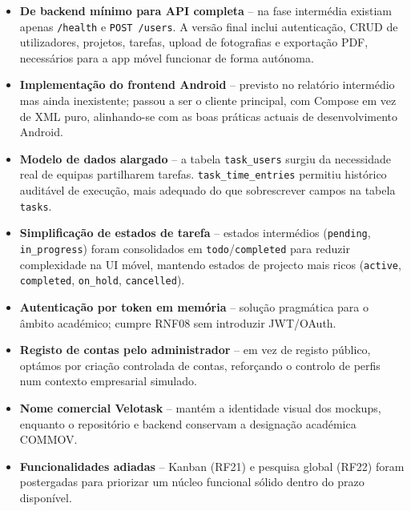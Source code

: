 \documentclass[12pt,a4paper]{article}
\begin{document}
\begin{itemize}[leftmargin=*]
    \item \textbf{De backend mínimo para API completa} -- na fase intermédia existiam apenas \texttt{/health} e \texttt{POST /users}. A versão final inclui autenticação, CRUD de utilizadores, projetos, tarefas, upload de fotografias e exportação PDF, necessários para a app móvel funcionar de forma autónoma.

    \item \textbf{Implementação do frontend Android} -- previsto no relatório intermédio mas ainda inexistente; passou a ser o cliente principal, com Compose em vez de XML puro, alinhando-se com as boas práticas actuais de desenvolvimento Android.

    \item \textbf{Modelo de dados alargado} -- a tabela \texttt{task\_users} surgiu da necessidade real de equipas partilharem tarefas. \texttt{task\_time\_entries} permitiu histórico auditável de execução, mais adequado do que sobrescrever campos na tabela \texttt{tasks}.

    \item \textbf{Simplificação de estados de tarefa} -- estados intermédios (\texttt{pending}, \texttt{in\_progress}) foram consolidados em \texttt{todo}/\texttt{completed} para reduzir complexidade na UI móvel, mantendo estados de projecto mais ricos (\texttt{active}, \texttt{completed}, \texttt{on\_hold}, \texttt{cancelled}).

    \item \textbf{Autenticação por token em memória} -- solução pragmática para o âmbito académico; cumpre RNF08 sem introduzir JWT/OAuth.

    \item \textbf{Registo de contas pelo administrador} -- em vez de registo público, optámos por criação controlada de contas, reforçando o controlo de perfis num contexto empresarial simulado.

    \item \textbf{Nome comercial Velotask} -- mantém a identidade visual dos mockups, enquanto o repositório e backend conservam a designação académica COMMOV.

    \item \textbf{Funcionalidades adiadas} -- Kanban (RF21) e pesquisa global (RF22) foram postergadas para priorizar um núcleo funcional sólido dentro do prazo disponível.
\end{itemize}
\end{document}
